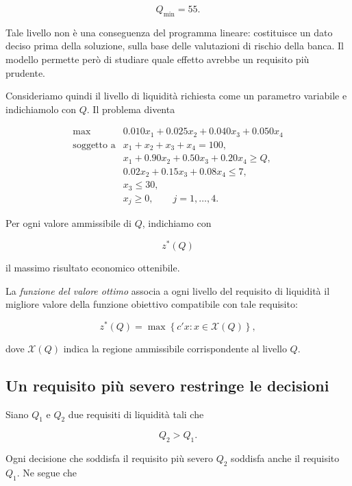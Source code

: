 \[
Q_{\min}=55.
\]

Tale livello non \`e una conseguenza del programma lineare: costituisce un
dato deciso prima della soluzione, sulla base delle valutazioni di rischio
della banca. Il modello permette per\`o di studiare quale effetto avrebbe un
requisito pi\`u prudente.

Consideriamo quindi il livello di liquidit\`a richiesta come un parametro
variabile e indichiamolo con \(Q\). Il problema diventa

\[
\begin{array}{ll}
\max
&
0.010x_1+0.025x_2+0.040x_3+0.050x_4
\\[4pt]
\mbox{soggetto a}
&
x_1+x_2+x_3+x_4=100,
\\[2pt]
&
x_1+0.90x_2+0.50x_3+0.20x_4\geq Q,
\\[2pt]
&
0.02x_2+0.15x_3+0.08x_4\leq7,
\\[2pt]
&
x_3\leq30,
\\[2pt]
&
x_j\geq0,
\qquad j=1,\ldots,4.
\end{array}
\]

Per ogni valore ammissibile di \(Q\), indichiamo con

\[
z^*(Q)
\]

\noindent il massimo risultato economico ottenibile.

\begin{definition}

La \emph{funzione del valore ottimo} associa a ogni livello del requisito di
liquidit\`a il migliore valore della funzione obiettivo compatibile con tale
requisito:

\[
z^*(Q)
=
\max
\left\{
c'x:
x\in\mathcal{X}(Q)
\right\},
\]

dove \(\mathcal{X}(Q)\) indica la regione ammissibile corrispondente al livello
\(Q\).

\end{definition}

\subsection{Un requisito pi\`u severo restringe le decisioni}

Siano \(Q_1\) e \(Q_2\) due requisiti di liquidit\`a tali che

\[
Q_2>Q_1.
\]

Ogni decisione che soddisfa il requisito pi\`u severo \(Q_2\) soddisfa anche
il requisito \(Q_1\). Ne segue che

